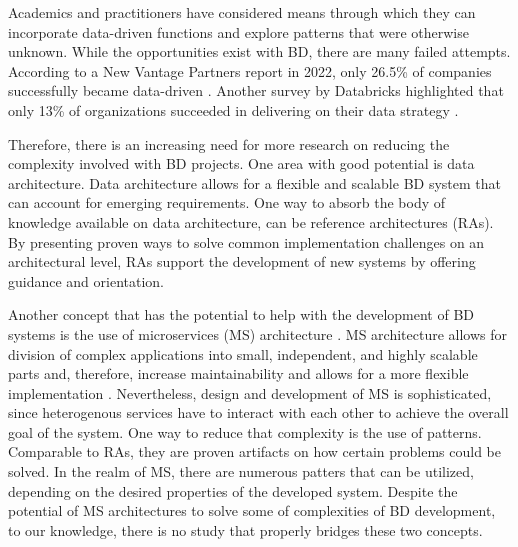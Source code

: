 \documentclass{bmcart}
\begin{document}
Academics and practitioners have considered means through which they can incorporate data-driven functions and explore patterns that were otherwise unknown. While the opportunities exist with BD, there are many failed attempts. According to a New Vantage Partners report in 2022, only 26.5\% of companies successfully became data-driven \cite{NewVantageSurvey}. Another survey by Databricks highlighted that only 13\% of organizations succeeded in delivering on their data strategy \cite{DataBricksSurvey}. 

Therefore, there is an increasing need for more research on reducing the complexity involved with BD projects. One area with good potential is data architecture. Data architecture allows for a flexible and scalable BD system that can account for emerging requirements. One way to absorb the body of knowledge available on data architecture, can be reference architectures (RAs). By presenting proven ways to solve common implementation challenges on an architectural level, RAs support the development of new systems by offering guidance and orientation.





% 


Another concept that has the potential to help with the development of BD systems is the use of microservices (MS) architecture \cite{freymann2020tackling}. MS architecture allows for division of complex applications into small, independent, and highly scalable parts and, therefore, increase maintainability and allows for a more flexible implementation \cite{Richardson.2022}. Nevertheless, design and development of MS is sophisticated, since heterogenous services have to interact with each other to achieve the overall goal of the system. One way to reduce that complexity is the use of patterns. Comparable to RAs, they are proven artifacts on how certain problems could be solved. In the realm of MS, there are numerous patters that can be utilized, depending on the desired properties of the developed system. Despite the potential of MS architectures to solve some of complexities of BD development, to our knowledge, there is no study that properly bridges these two concepts. 

\end{document}
